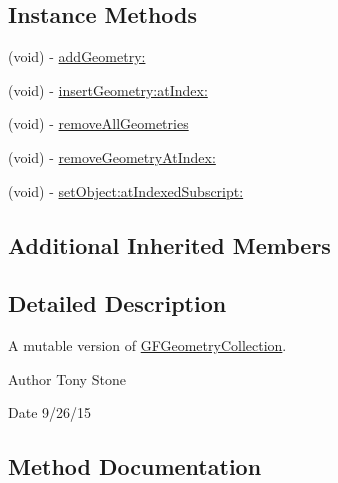 \subsection*{Instance Methods}
\begin{DoxyCompactItemize}
\item 
(void) -\/ \hyperlink{interface_g_f_mutable_geometry_collection_addf8aa56e2b97984376a93a6f2e2c840}{add\+Geometry\+:}
\item 
(void) -\/ \hyperlink{interface_g_f_mutable_geometry_collection_a457c530bc713c150036e75a0f76fc7e0}{insert\+Geometry\+:at\+Index\+:}
\item 
(void) -\/ \hyperlink{interface_g_f_mutable_geometry_collection_a2d260d5b39e15961283b27f6fa5f4cb1}{remove\+All\+Geometries}
\item 
(void) -\/ \hyperlink{interface_g_f_mutable_geometry_collection_a8532baf7d75daa26227369cb26a41593}{remove\+Geometry\+At\+Index\+:}
\item 
(void) -\/ \hyperlink{interface_g_f_mutable_geometry_collection_a7c8d7c0a97ee27b23e2dab6a14bc8dc2}{set\+Object\+:at\+Indexed\+Subscript\+:}
\end{DoxyCompactItemize}
\subsection*{Additional Inherited Members}


\subsection{Detailed Description}
A mutable version of \hyperlink{interface_g_f_geometry_collection}{G\+F\+Geometry\+Collection}. 

\begin{DoxyAuthor}{Author}
Tony Stone 
\end{DoxyAuthor}
\begin{DoxyDate}{Date}
9/26/15 
\end{DoxyDate}


\subsection{Method Documentation}
\hypertarget{interface_g_f_mutable_geometry_collection_addf8aa56e2b97984376a93a6f2e2c840}{}
